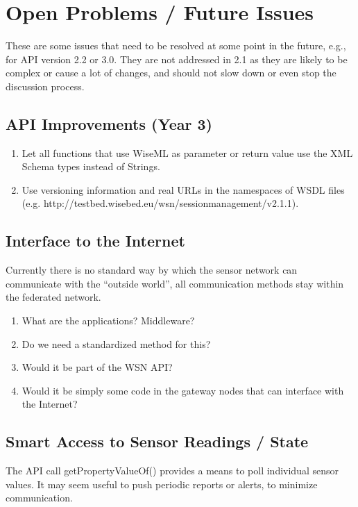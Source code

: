 \section{Open Problems / Future Issues}
\label{sec:openproblems}

These are some issues that need to be resolved at some point in the future, e.g., for API version 2.2 or 3.0. They are not addressed in 2.1 as they are likely to be complex or cause a lot of changes, and should not slow down or even stop the discussion process.

\subsection{API Improvements (Year 3)}

	\begin{enumerate}
		\item Let all functions that use WiseML as parameter or return value use the XML Schema types instead of Strings.
		\item Use versioning information and real URLs in the namespaces of WSDL files (e.g. http://testbed.wisebed.eu/wsn/sessionmanagement/v2.1.1).
	\end{enumerate}

\subsection{Interface to the Internet}

Currently there is no standard way by which the sensor network can communicate with the ``outside world'', all communication methods stay within the federated network.

\begin{enumerate}
\item What are the applications? Middleware? 
\item Do we need a standardized method for this?
\item Would it be part of the WSN API?
\item Would it be simply some code in the gateway nodes that can interface with the Internet?
\end{enumerate}



\subsection{Smart Access to Sensor Readings / State}

The API call getPropertyValueOf() provides a means to poll individual sensor values. It may seem useful to push periodic reports or alerts, to minimize communication.

